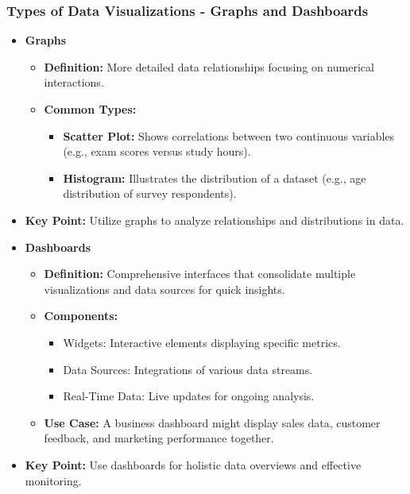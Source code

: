 \documentclass{beamer}
\begin{document}
\begin{frame}[fragile]
    \frametitle{Types of Data Visualizations - Graphs and Dashboards}
    \begin{itemize}
        \item \textbf{Graphs}
        \begin{itemize}
            \item \textbf{Definition:} More detailed data relationships focusing on numerical interactions.
            \item \textbf{Common Types:}
            \begin{itemize}
                \item \textbf{Scatter Plot:} Shows correlations between two continuous variables (e.g., exam scores versus study hours).
                \item \textbf{Histogram:} Illustrates the distribution of a dataset (e.g., age distribution of survey respondents).
            \end{itemize}
        \end{itemize}
        \item \textbf{Key Point:} Utilize graphs to analyze relationships and distributions in data.
        
        \item \textbf{Dashboards}
        \begin{itemize}
            \item \textbf{Definition:} Comprehensive interfaces that consolidate multiple visualizations and data sources for quick insights.
            \item \textbf{Components:}
            \begin{itemize}
                \item Widgets: Interactive elements displaying specific metrics.
                \item Data Sources: Integrations of various data streams.
                \item Real-Time Data: Live updates for ongoing analysis.
            \end{itemize}
            \item \textbf{Use Case:} A business dashboard might display sales data, customer feedback, and marketing performance together.
        \end{itemize}
        \item \textbf{Key Point:} Use dashboards for holistic data overviews and effective monitoring.
    \end{itemize}
\end{frame}
\end{document}
